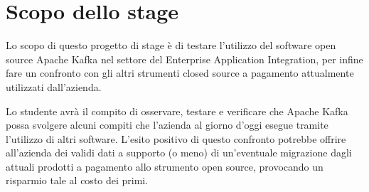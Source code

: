 \section*{Scopo dello stage}
Lo scopo di questo progetto di stage è di testare l'utilizzo del software open source Apache Kafka nel settore del Enterprise Application Integration, per infine fare un confronto con gli altri strumenti closed source a pagamento attualmente utilizzati dall'azienda.

Lo studente avrà il compito di osservare, testare e verificare che Apache Kafka possa svolgere alcuni compiti che l'azienda al giorno d'oggi esegue tramite l'utilizzo di altri software.
L'esito positivo di questo confronto potrebbe offrire all'azienda dei validi dati a supporto (o meno) di un'eventuale migrazione dagli attuali prodotti a pagamento allo strumento open source, provocando un risparmio tale al costo dei primi.
